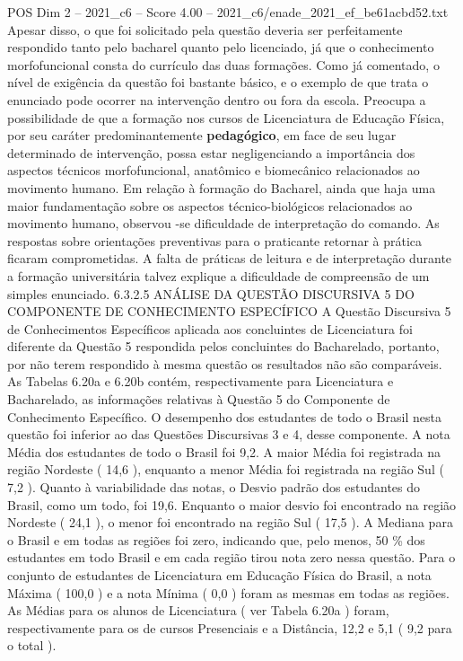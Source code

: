 \begin{textsample}{POS Dim 2 – 2021\_c6 – Score 4.00 – 2021\_c6/enade\_2021\_ef\_be61acbd52.txt}
Apesar disso, o que foi solicitado pela questão deveria ser perfeitamente respondido tanto pelo bacharel quanto pelo licenciado, já que o conhecimento morfofuncional consta do currículo das duas formações.
Como já comentado, o nível de exigência da questão foi bastante básico, e o exemplo de que trata o enunciado pode ocorrer na intervenção dentro ou fora da escola.
Preocupa a possibilidade de que a formação nos cursos de Licenciatura de Educação Física, por seu caráter predominantemente \textbf{pedagógico}, em face de seu lugar determinado de intervenção, possa estar negligenciando a importância dos aspectos técnicos morfofuncional, anatômico e biomecânico relacionados ao movimento humano.
Em relação à formação do Bacharel, ainda que haja uma maior fundamentação sobre os aspectos técnico-biológicos relacionados ao movimento humano, observou -se dificuldade de interpretação do comando.
As respostas sobre orientações preventivas para o praticante retornar à prática ficaram comprometidas.
A falta de práticas de leitura e de interpretação durante a formação universitária talvez explique a dificuldade de compreensão de um simples enunciado. 6.3.2.5 ANÁLISE DA QUESTÃO DISCURSIVA 5 DO COMPONENTE DE CONHECIMENTO ESPECÍFICO A Questão Discursiva 5 de Conhecimentos Específicos aplicada aos concluintes de Licenciatura foi diferente da Questão 5 respondida pelos concluintes do Bacharelado, portanto, por não terem respondido à mesma questão os resultados não são comparáveis.
As Tabelas 6.20a e 6.20b contém, respectivamente para Licenciatura e Bacharelado, as informações relativas à Questão 5 do Componente de Conhecimento Específico.
O desempenho dos estudantes de todo o Brasil nesta questão foi inferior ao das Questões Discursivas 3 e 4, desse componente.
A nota Média dos estudantes de todo o Brasil foi 9,2.
A maior Média foi registrada na região Nordeste ( 14,6 ), enquanto a menor Média foi registrada na região Sul ( 7,2 ).
Quanto à variabilidade das notas, o Desvio padrão dos estudantes do Brasil, como um todo, foi 19,6.
Enquanto o maior desvio foi encontrado na região Nordeste ( 24,1 ), o menor foi encontrado na região Sul ( 17,5 ).
A Mediana para o Brasil e em todas as regiões foi zero, indicando que, pelo menos, 50 \% dos estudantes em todo Brasil e em cada região tirou nota zero nessa questão.
Para o conjunto de estudantes de Licenciatura em Educação Física do Brasil, a nota Máxima ( 100,0 ) e a nota Mínima ( 0,0 ) foram as mesmas em todas as regiões.
As Médias para os alunos de Licenciatura ( ver Tabela 6.20a ) foram, respectivamente para os de cursos Presenciais e a Distância, 12,2 e 5,1 ( 9,2 para o total ).

\end{textsample}
